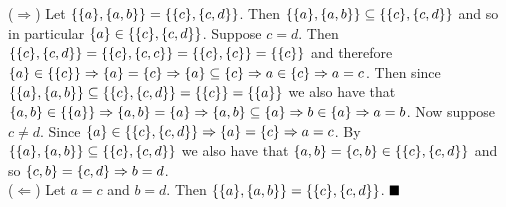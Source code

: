 \documentclass[12pt]{book}
\begin{document}
\begin{enumerate}
{($\Rightarrow$) Let $\set{\set{a},\set{a,b}} = \set{\set{c},\set{c,d}}$. Then $\set{\set{a},\set{a,b}} \subseteq \set{\set{c},\set{c,d}}$ and so in particular $\set{a} \in \set{\set{c},\set{c,d}}$. Suppose $c = d$. Then $\set{\set{c},\set{c,d}} = \set{\set{c},\set{c,c}} = \set{\set{c},\set{c}} = \set{\set{c}}$ and therefore $\set{a} \in \set{\set{c}} \Rightarrow \set{a} = \set{c} \Rightarrow \set{a} \subseteq \set{c} \Rightarrow a \in \set{c} \Rightarrow a = c$. Then since $\set{\set{a},\set{a,b}} \subseteq \set{\set{c},\set{c,d}} = \set{\set{c}} = \set{\set{a}}$ we also have that $\set{a,b} \in \set{\set{a}} \Rightarrow \set{a,b} = \set{a} \Rightarrow \set{a,b} \subseteq \set{a} \Rightarrow b \in \set{a} \Rightarrow a = b$. Now suppose $c \neq d$. Since $\set{a} \in \set{\set{c},\set{c,d}} \Rightarrow \set{a} = \set{c} \Rightarrow a = c$. By $\set{\set{a},\set{a,b}} \subseteq \set{\set{c},\set{c,d}}$ we also have that $\set{a,b} = \set{c,b} \in \set{\set{c},\set{c,d}}$ and so $\set{c,b} = \set{c,d} \Rightarrow b = d$.\\ ($\Leftarrow$) Let $a = c$ and $b = d$. Then $\set{\set{a},\set{a,b}} = \set{\set{c},\set{c,d}}$. $\qed$}
\end{enumerate}

\hrulefill
\end{document}
